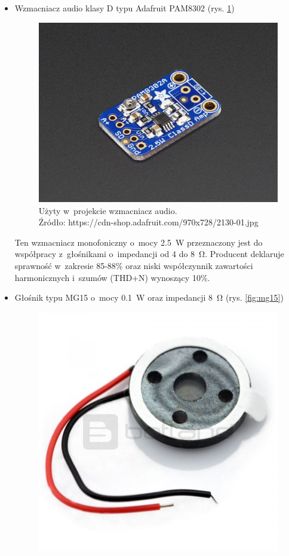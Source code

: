 \begin{enumerate}
\begin{itemize}
		\item Wzmacniacz audio klasy D typu Adafruit PAM8302 (rys. \ref{fig:pam8302})\\
		\begin{figure}[h!]
			\centering
			\includegraphics[scale=0.2]{../Assets/wzmacniacz_pam8302.png}
			\caption{Użyty w~projekcie wzmacniacz audio.\\ Źródło: https://cdn-shop.adafruit.com/970x728/2130-01.jpg}
			\label{fig:pam8302}
		\end{figure}
		Ten wzmacniacz monofoniczny o~mocy \SI{2.5}{\W} przeznaczony jest do współpracy z~głośnikami o~impedancji od \SI{4}{} do \SI{8}{\ohm}. Producent deklaruje sprawność w~zakresie 85-88\% \cite{speakeropamp} oraz niski współczynnik zawartości harmonicznych i~szumów (THD+N) wynoszący 10\%.
		\item Głośnik typu MG15 o~mocy \SI{0.1}{\W} oraz impedancji \SI{8}{\ohm} (rys. \ref{fig:mg15})\\
		\begin{figure}[h!]
			\centering
			\includegraphics[scale=0.1]{../Assets/glosnik_mg15.png}

\end{figure}
\end{itemize}
\end{enumerate}
